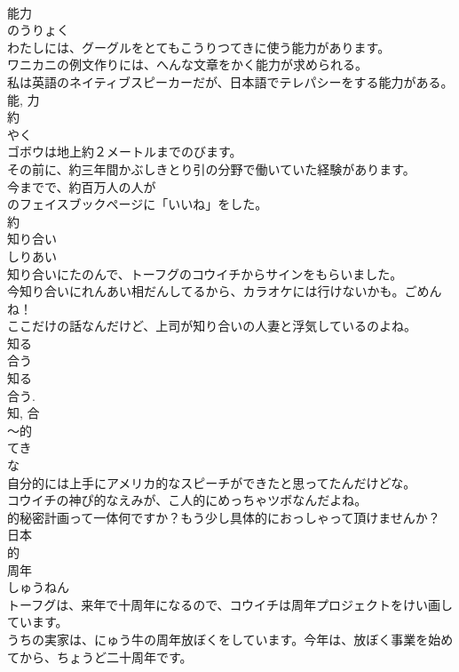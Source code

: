 \documentclass[8pt]{extreport}
\begin{document}
\begin{CJK}{UTF8}{min}
\\	能力	
\\	のうりょく	
\\	わたしには、グーグルをとてもこうりつてきに使う能力があります。	
\\	ワニカニの例文作りには、へんな文章をかく能力が求められる。	
\\	私は英語のネイティブスピーカーだが、日本語でテレパシーをする能力がある。	
\\	能, 力	
\\	約	
\\	やく	
\\	ゴボウは地上約２メートルまでのびます。	
\\	その前に、約三年間かぶしきとり引の分野で働いていた経験があります。	
\\	今までで、約百万人の人が
\\	のフェイスブックページに「いいね」をした。	
\\	約	
\\	知り合い	
\\	しりあい	
\\	知り合いにたのんで、トーフグのコウイチからサインをもらいました。	
\\	今知り合いにれんあい相だんしてるから、カラオケには行けないかも。ごめんね！	
\\	ここだけの話なんだけど、上司が知り合いの人妻と浮気しているのよね。	
\\	知る 
\\	合う 
\\	知る 
\\	合う. 
\\	知, 合	
\\	〜的	
\\	てき	
\\	な 
\\	自分的には上手にアメリカ的なスピーチができたと思ってたんだけどな。	
\\	コウイチの神ぴ的なえみが、こ人的にめっちゃツボなんだよね。	
\\	的秘密計画って一体何ですか？もう少し具体的におっしゃって頂けませんか？	
\\	日本 
\\	的	
\\	周年	
\\	しゅうねん	
\\	トーフグは、来年で十周年になるので、コウイチは周年プロジェクトをけい画しています。	
\\	うちの実家は、にゅう牛の周年放ぼくをしています。今年は、放ぼく事業を始めてから、ちょうど二十周年です。	

\end{CJK}
\end{document}
